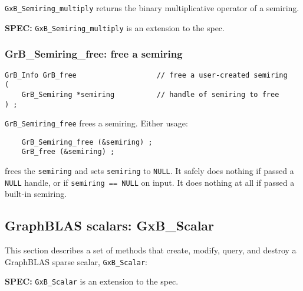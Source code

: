 \documentclass[12pt]{article}
\begin{document}
\verb'GxB_Semiring_multiply' returns the binary multiplicative operator of a
semiring.

\begin{spec}
{\bf SPEC:} \verb'GxB_Semiring_multiply' is an extension to the spec.
\end{spec}


\subsubsection{{\sf GrB\_Semiring\_free:} free a semiring}
\label{semiring_free}

\begin{mdframed}[userdefinedwidth=6in]
{\footnotesize
\begin{verbatim}
GrB_Info GrB_free                   // free a user-created semiring
(
    GrB_Semiring *semiring          // handle of semiring to free
) ;
\end{verbatim}
} \end{mdframed}

\verb'GrB_Semiring_free' frees a semiring.  Either usage:

    {\small
    \begin{verbatim}
    GrB_Semiring_free (&semiring) ;
    GrB_free (&semiring) ; \end{verbatim}}

\noindent
frees the \verb'semiring' and sets \verb'semiring' to \verb'NULL'.  It safely
does nothing if passed a \verb'NULL' handle, or if \verb'semiring == NULL' on
input.  It does nothing at all if passed a built-in semiring.

\newpage
\subsection{GraphBLAS scalars: {\sf GxB\_Scalar}} %
\label{scalar}

This section describes a set of methods that create, modify, query,
and destroy a GraphBLAS sparse scalar, \verb'GxB_Scalar':

\begin{spec}
{\bf SPEC:} \verb'GxB_Scalar' is an extension to the spec.
\end{spec}
\end{document}
